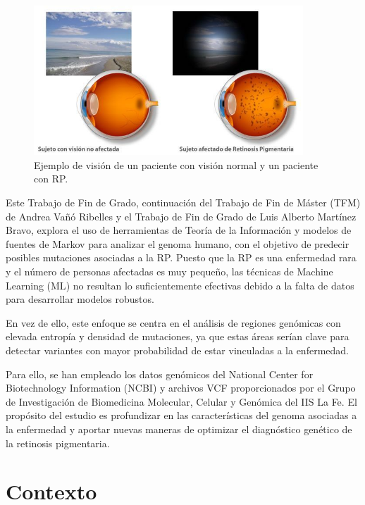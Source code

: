 \documentclass[11pt,spanish,listoffigures,listoftables]{tfgetsinf}
\begin{document}
\begin{figure}[H]
   \centering
   \includegraphics[width=0.9\textwidth]{Retinosis-Pigmetaria.jpg}
   \caption{Ejemplo de visión de un paciente con visión normal y un paciente con \acs{RP}.}
   \label{fig:etiqueta_opcional2}
\end{figure}

Este Trabajo de Fin de Grado, continuación del Trabajo de Fin de Máster (\acs{TFM}) de Andrea Vañó Ribelles\cite{VAN} y el Trabajo de Fin de Grado de Luis Alberto Martínez Bravo\cite{MAR}, explora el uso de herramientas de Teoría de la Información y modelos de fuentes de Markov para analizar el genoma humano, con el objetivo de predecir posibles mutaciones asociadas a la \acs{RP}. Puesto que la \acs{RP} es una enfermedad rara y el número de personas afectadas es muy pequeño, las técnicas de Machine Learning (\acs{ML}) no resultan lo suficientemente efectivas debido a la falta de datos para desarrollar modelos robustos. 

 

En vez de ello, este enfoque se centra en el análisis de regiones genómicas con elevada entropía y densidad de mutaciones, ya que estas áreas serían clave para detectar variantes con mayor probabilidad de estar vinculadas a la enfermedad. 

 

Para ello, se han empleado los datos genómicos del National Center for Biotechnology Information (\acs{NCBI}) y archivos \acs{VCF} proporcionados por el Grupo de Investigación de Biomedicina Molecular, Celular y Genómica del \acs{IIS} La Fe. El propósito del estudio es profundizar en las características del genoma asociadas a la enfermedad y aportar nuevas maneras de optimizar el diagnóstico genético de la retinosis pigmentaria. 

\section{Contexto}
\end{document}
